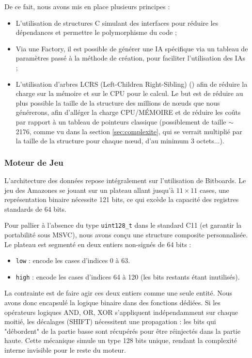 \documentclass[11pt,a4paper,titlepage,oneside]{article}
\begin{document}
    De ce fait, nous avons mis en place plusieurs principes :
    \begin{itemize}
        \item L'utilisation de structures C simulant des interfaces pour réduire les dépendances et permettre le polymorphisme du code ; 
        \item Via une Factory, il est possible de générer une IA spécifique via un tableau de paramètres passé à la méthode de création, pour faciliter l'utilisation des IAs ;
        \item L'utilisation d'arbres LCRS (Left-Children Right-Sibling) (\cite{geekslcrs}) afin de réduire la charge sur la mémoire et sur le CPU pour le calcul. Le but est de réduire au plus possible la taille de la structure des millions de nœuds que nous générerons, afin d'alléger la charge CPU/MÉMOIRE et de réduire les coûts par rapport à un tableau de pointeurs classique (possiblement de taille $\mathtt{\sim}$2176, comme vu dans la section \ref{sec:complexite}, qui se verrait multiplié par la taille de la structure pour chaque nœud, d'au minimum 3 octets...).
    \end{itemize}

    \subsubsection{Moteur de Jeu}
    L'architecture des données repose intégralement sur l'utilisation de Bitboards. Le jeu des Amazones se jouant sur un plateau allant jusqu'à $11\times11$ cases, une représentation binaire nécessite 121 bits, ce qui excède la capacité des registres standards de 64 bits.

    Pour pallier à l'absence du type \texttt{uint128\_t} dans le standard C11 (et garantir la portabilité sous MSVC), nous avons conçu une structure composite personnalisée. Le plateau est segmenté en deux entiers non-signés de 64 bits :
    \begin{itemize}
        \item \texttt{low} : encode les cases d'indices 0 à 63.
        \item \texttt{high} : encode les cases d'indices 64 à 120 (les bits restants étant inutilisés).
    \end{itemize}

    La contrainte est de faire agir ces deux entiers comme une seule entité. Nous avons donc encapsulé la logique binaire dans des fonctions dédiées. 
    Si les opérateurs logiques AND, OR, XOR s'appliquent indépendamment sur chaque moitié, les décalages (SHIFT) nécessitent une propagation : les bits qui "débordent" de la partie basse sont récupérés pour être réinjectés dans la partie haute. Cette mécanique simule un type 128 bits unique, rendant la complexité interne invisible pour le reste du moteur.
    
\end{document}
